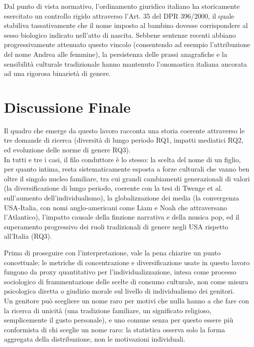 \documentclass[conference]{IEEEtran}
\begin{document}
Dal punto di vista normativo, l'ordinamento giuridico italiano ha storicamente esercitato un controllo 
rigido attraverso l'Art. 35 del DPR 396/2000, il quale stabiliva tassativamente che il nome imposto 
al bambino dovesse corrispondere al sesso biologico indicato nell'atto di nascita. Sebbene sentenze
 recenti abbiano progressivamente attenuato questo vincolo (consentendo ad esempio l'attribuzione del nome 
 Andrea alle femmine), la persistenza delle prassi anagrafiche e la sensibilità culturale tradizionale 
 hanno mantenuto l'onomastica italiana ancorata ad una rigorosa binarietà di genere.

\section{Discussione Finale}
\label{sec:discussione}

Il quadro che emerge da questo lavoro racconta una storia coerente attraverso le tre domande 
di ricerca (diversità di lungo periodo RQ1, impatti mediatici RQ2, ed evoluzione delle norme di genere RQ3). \\
In tutti e tre i casi, il filo conduttore è lo stesso: la scelta del nome di un figlio, per quanto intima, 
resta sistematicamente esposta a forze culturali che vanno ben oltre il singolo nucleo familiare, 
tra cui grandi cambiamenti generazionali di valori (la diversificazione di lungo periodo, coerente con la 
tesi di Twenge et al. sull'aumento dell'individualismo), la globalizzazione dei media 
(la convergenza USA-Italia, con nomi anglo-americani come Liam e Noah che attraversano l'Atlantico), 
l'impatto causale della finzione narrativa e della musica pop, ed il superamento progressivo dei ruoli 
tradizionali di genere negli USA rispetto all'Italia (RQ3).

Prima di proseguire con l'interpretazione, vale la pena chiarire un punto concettuale: le metriche di
concentrazione e diversificazione usate in questo lavoro fungono da proxy quantitativo per
l'individualizzazione, intesa come processo sociologico di frammentazione delle scelte di consumo
culturale, non come misura psicologica diretta o giudizio morale sul livello di individualismo dei
genitori. \\
Un genitore può scegliere un nome raro per motivi che nulla hanno a che fare con la ricerca
di unicità (una tradizione familiare, un significato religioso, semplicemente il gusto personale), e
uno comune senza per questo essere più conformista di chi sceglie un nome raro: la statistica osserva
solo la forma aggregata della distribuzione, non le motivazioni individuali.
\end{document}
